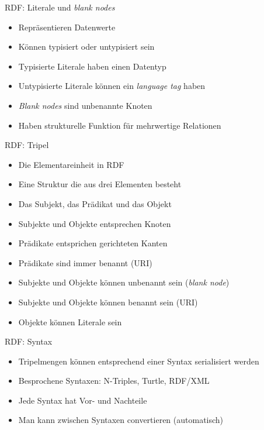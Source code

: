 \documentclass{beamer}
\begin{document}
\begin{frame}{RDF: Literale und \emph{blank nodes}}
	
	\begin{itemize}
		\item Repräsentieren Datenwerte
		\item Können typisiert oder untypisiert sein
		\item Typisierte Literale haben einen Datentyp
		\item Untypisierte Literale können ein \emph{language tag} haben
		\item \emph{Blank nodes} sind unbenannte Knoten
		\item Haben strukturelle Funktion für mehrwertige Relationen
	\end{itemize}
	
\end{frame}

\begin{frame}{RDF: Tripel}
	
	\begin{itemize}
		\item Die Elementareinheit in RDF
		\item Eine Struktur die aus drei Elementen besteht
		\item Das Subjekt, das Prädikat und das Objekt
		\item Subjekte und Objekte entsprechen Knoten 
		\item Prädikate entsprichen gerichteten Kanten
		\item Prädikate sind immer benannt (URI)
		\item Subjekte und Objekte können unbenannt sein (\emph{blank node})
		\item Subjekte und Objekte können benannt sein (URI)
		\item Objekte können Literale sein
	\end{itemize}
	
\end{frame}

\begin{frame}{RDF: Syntax}
	
	\begin{itemize}
		\item Tripelmengen können entsprechend einer Syntax serialisiert werden
		\item Besprochene Syntaxen: N-Triples, Turtle, RDF/XML
		\item Jede Syntax hat Vor- und Nachteile
		\item Man kann zwischen Syntaxen convertieren (automatisch)
	\end{itemize}
	
\end{frame}
\end{document}
